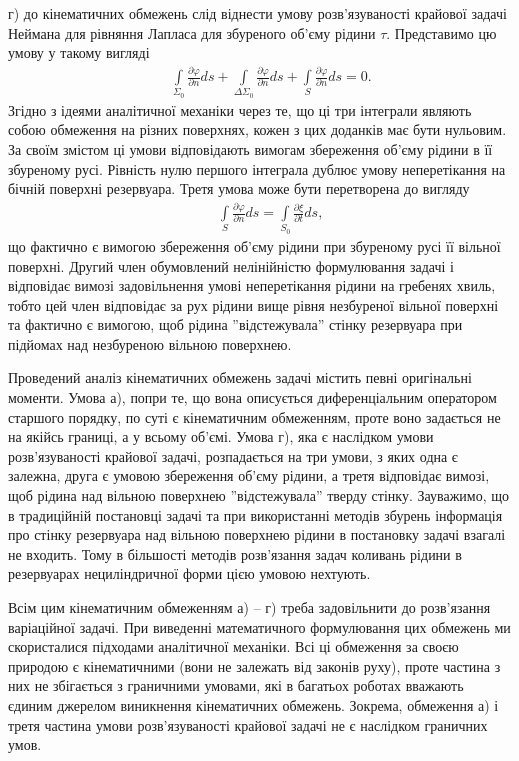 \documentclass[11pt, reqno]{amsart}
\begin{document}
г) до кінематичних обмежень слід віднести умову розв'язуваності крайової задачі Неймана для рівняння Лапласа для збуреного об'єму рідини $\tau$. Представимо цю умову у такому вигляді
\begin{eqnarray}\label{5}
    &&\int\limits_{\Sigma_0} \frac{\partial \varphi}{\partial n} ds + \int\limits_{\Delta \Sigma_0} \frac{\partial \varphi}{\partial n} ds +
       \int\limits_{S} \frac{\partial \varphi}{\partial n} ds =0.
\end{eqnarray}
Згідно з ідеями аналітичної механіки через те, що ці три інтеграли являють собою обмеження на різних поверхнях, кожен з цих доданків має бути нульовим. За своїм змістом ці умови відповідають вимогам збереження об'єму рідини в її збуреному русі. Рівність нулю першого інтеграла дублює умову неперетікання на бічній поверхні резервуара. Третя умова може бути перетворена до вигляду
\begin{eqnarray*}
   &&\int \limits_{S} \frac{\partial \varphi}{\partial n} ds = \int \limits_{S_0} \frac{\partial \xi}{\partial t} ds,
\end{eqnarray*}
що фактично є вимогою збереження об'єму рідини при збуреному русі її вільної поверхні. Другий член обумовлений нелінійністю формулювання задачі і відповідає вимозі задовільнення умові неперетікання рідини на гребенях хвиль, тобто цей член відповідає за рух рідини вище рівня незбуреної вільної поверхні та фактично є вимогою, щоб рідина ''відстежувала'' стінку резервуара при підйомах над незбуреною вільною поверхнею.

Проведений аналіз кінематичних обмежень задачі містить певні оригінальні моменти. Умова а), попри те, що вона описується диференціальним оператором старшого порядку, по суті є кінематичним обмеженням, проте воно задається не на якійсь границі, а у всьому об'ємі. Умова г), яка є наслідком умови розв'язуваності крайової задачі, розпадається на три умови, з яких одна є залежна, друга є умовою збереження об'єму рідини, а третя відповідає вимозі, щоб рідина над вільною поверхнею ''відстежувала'' тверду стінку. Зауважимо, що в традиційній постановці задачі та при використанні методів збурень інформація про стінку резервуара над вільною поверхнею рідини в постановку задачі взагалі не входить. Тому в більшості методів розв'язання задач коливань рідини в резервуарах нециліндричної форми цією умовою нехтують.

Всім цим кінематичним обмеженням а) -- г) треба задовільнити до розв'язання варіаційної задачі. При виведенні математичного формулювання цих обмежень ми скористалися підходами аналітичної механіки. Всі ці обмеження за своєю природою є кінематичними (вони не залежать від законів руху), проте частина з них не збігається з граничними умовами, які в багатьох роботах вважають єдиним джерелом виникнення кінематичних обмежень. Зокрема, обмеження а) і третя частина умови розв'язуваності крайової задачі не є наслідком граничних умов.
\end{document}
